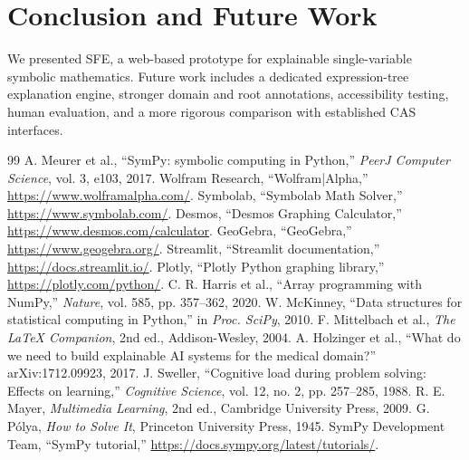 \documentclass[11pt]{article}
\begin{document}
\section{Conclusion and Future Work}
We presented SFE, a web-based prototype for explainable single-variable symbolic mathematics. Future work includes a dedicated expression-tree explanation engine, stronger domain and root annotations, accessibility testing, human evaluation, and a more rigorous comparison with established CAS interfaces.

\begin{thebibliography}{99}
 A. Meurer et al., ``SymPy: symbolic computing in Python,'' \emph{PeerJ Computer Science}, vol. 3, e103, 2017.
 Wolfram Research, ``Wolfram|Alpha,'' \url{https://www.wolframalpha.com/}.
 Symbolab, ``Symbolab Math Solver,'' \url{https://www.symbolab.com/}.
 Desmos, ``Desmos Graphing Calculator,'' \url{https://www.desmos.com/calculator}.
 GeoGebra, ``GeoGebra,'' \url{https://www.geogebra.org/}.
 Streamlit, ``Streamlit documentation,'' \url{https://docs.streamlit.io/}.
 Plotly, ``Plotly Python graphing library,'' \url{https://plotly.com/python/}.
 C. R. Harris et al., ``Array programming with NumPy,'' \emph{Nature}, vol. 585, pp. 357--362, 2020.
 W. McKinney, ``Data structures for statistical computing in Python,'' in \emph{Proc. SciPy}, 2010.
 F. Mittelbach et al., \emph{The LaTeX Companion}, 2nd ed., Addison-Wesley, 2004.
 A. Holzinger et al., ``What do we need to build explainable AI systems for the medical domain?'' arXiv:1712.09923, 2017.
 J. Sweller, ``Cognitive load during problem solving: Effects on learning,'' \emph{Cognitive Science}, vol. 12, no. 2, pp. 257--285, 1988.
 R. E. Mayer, \emph{Multimedia Learning}, 2nd ed., Cambridge University Press, 2009.
 G. Pólya, \emph{How to Solve It}, Princeton University Press, 1945.
 SymPy Development Team, ``SymPy tutorial,'' \url{https://docs.sympy.org/latest/tutorials/}.
\end{thebibliography}
\end{document}
